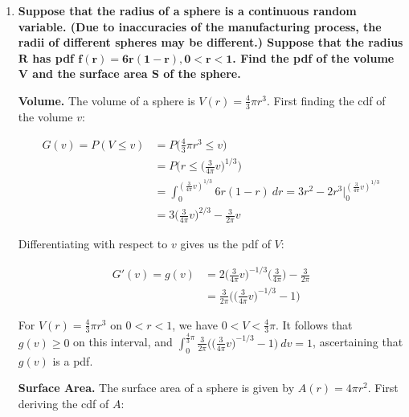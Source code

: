 \documentclass[10pt, oneside]{article}
\begin{document}
\begin{enumerate}[label=5.\arabic*]
\begin{enumerate}
	Differentiating with respect to $w$ yields $G'(w) = g(w) = \boxed{1}$. Since $W = |X|, -1 < X < 1$ implies $0 < W < 1$, clearly $g(w) \geq 0$ on that interval. Moreover, $\int^1_0 w \ dw = \boxed{1}$, confirming $g(w)$ is a pdf.
	
	\end{enumerate}

\item  \begin{tcolorbox}[
  colback=Cerulean!5!white,
  colframe=Cerulean!75!black]
\textbf{Suppose that the radius of a sphere is a continuous random variable. (Due to inaccuracies of the manufacturing process, the radii of different spheres may be different.) Suppose that the radius $\bm{R}$ has pdf $\bm{f(r) = 6r(1-r), 0 < r < 1}$. Find the pdf of the volume $\bm{V}$ and the surface area $\bm{S}$ of the sphere.}
\end{tcolorbox}

\textbf{Volume.} The volume of a sphere is $V(r) = \frac{4}{3} \pi r^3$. First finding the cdf of the volume $v$:

\begin{align*}
G(v) = P(V \leq v) &= P \Big( \frac{4}{3} \pi r^3 \leq v \Big) \\
&= P \Big( r \leq \Big( \frac{3}{4 \pi} v \Big)^{1/3} \Big) \\
&= \int^{(\frac{3}{4 \pi} v)^{1/3}}_0 6r(1 - r) \ dr = 3r^2 - 2r^3 \Big|^{(\frac{3}{4 \pi} v)^{1/3}}_0 \\
&= 3 \Big( \frac{3}{4 \pi} v \Big)^{2/3} - \frac{3}{2 \pi} v 
\end{align*}

Differentiating with respect to $v$ gives us the pdf of $V$:

\begin{align*}
G'(v) = g(v) &= 2 \Big( \frac{3}{4 \pi} v \Big)^{-1/3} \Big( \frac{3}{4 \pi} \Big) - \frac{3}{2 \pi} \\
&= \boxed{\frac{3}{2 \pi} \Big( \Big( \frac{3}{4 \pi} v \Big)^{-1/3} - 1 \Big)}
\end{align*}

For $V(r) = \frac{4}{3} \pi r^3$ on $0 < r < 1$, we have $0 < V < \frac{4}{3} \pi$. It follows that $g(v) \geq 0$ on this interval, and $\int^{\frac{4}{3} \pi}_0 \frac{3}{2 \pi} \Big( \Big( \frac{3}{4 \pi} v \Big)^{-1/3} - 1 \Big) \ dv = \boxed{1}$, ascertaining that $g(v)$ is a pdf.

\textbf{Surface Area.} The surface area of a sphere is given by $A(r) = 4 \pi r^2$. First deriving the cdf of $A$:


\end{enumerate}
\end{document}
